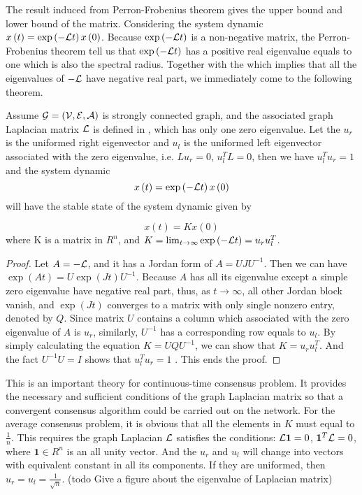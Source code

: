 The result induced from Perron-Frobenius theorem gives the upper bound
and lower bound of the matrix. Considering the system dynamic $x\left(t\right)=\exp\left(-{\cal L}t\right)x\left(0\right)$.
Because $\exp\left(-{\cal L}t\right)$ is a non-negative matrix, the
Perron-Frobenius theorem tell us that $\exp\left(-{\cal L}t\right)$
has a positive real eigenvalue equals to one which is also the spectral
radius. Together with the  which
implies that all the eigenvalues of $-{\cal L}$ have negative real
part, we immediately come to the following theorem.
\begin{thm}
Assume ${\cal G}=\left({\cal V},{\cal E},{\cal A}\right)$ is strongly
connected graph, and the associated graph Laplacian matrix ${\cal L}$
is defined in , which has only
one zero eigenvalue. Let the $u_{r}$ is the uniformed right eigenvector
and $u_{l}$ is the uniformed left eigenvector associated with the
zero eigenvalue, i.e. $Lu_{r}=0$, $u_{l}^{T}L=0$, then we have $u_{l}^{T}u_{r}=1$
and the system dynamic 
\begin{equation}
x\left(t\right)=\exp\left(-{\cal L}t\right)x\left(0\right)
\end{equation}
will have the stable state of the system dynamic given by

\begin{equation}
x\left(t\right)=Kx\left(0\right)
\end{equation}
 where K is a matrix in $R^{n}$, and $K=\lim_{t\to\infty}\exp\left(-{\cal L}t\right)=u_{r}u_{l}^{T}$. \end{thm}
\begin{proof}
Let $A=-{\cal L}$, and it has a Jordan form of $A=UJU^{-1}$. Then
we can have $\exp\left(At\right)=U\exp\left(Jt\right)U^{-1}$. Because
$A$ has all its eigenvalue except a simple zero eigenvalue have negative
real part, thus, as $t\to\infty$, all other Jordan block vanish,
and $\exp\left(Jt\right)$ converges to a matrix with only single
nonzero entry, denoted by $Q$. Since matrix $U$ contains a column
which associated with the zero eigenvalue of $A$ is $u_{r}$, similarly,
$U^{-1}$ has a corresponding row equals to $u_{l}$. By simply calculating
the equation $K=UQU^{-1}$, we can show that $K=u_{r}u_{l}^{T}$.
And the fact $U^{-1}U=I$ shows that $u_{l}^{T}u_{r}=1$ . This ends
the proof. 
\end{proof}
This is an important theory for continuous-time consensus problem.
It provides the necessary and sufficient conditions of the graph Laplacian
matrix so that a convergent consensus algorithm could be carried out
on the network. For the average consensus problem, it is obvious that
all the elements in $K$ must equal to $\frac{1}{n}$. This requires
the graph Laplacian ${\cal L}$ satisfies the conditions: ${\cal L}\mathbf{1}=0$,
$\mathbf{1}^{T}{\cal L}=0$, where $\mathbf{1}\in R^{n}$ is an all
unity vector. And the $u_{r}$ and $u_{l}$ will change into vectors
with equivalent constant in all its components. If they are uniformed,
then $u_{r}=u_{l}=\frac{1}{\sqrt{n}}.$ (todo Give a figure about
the eigenvalue of Laplacian matrix)


